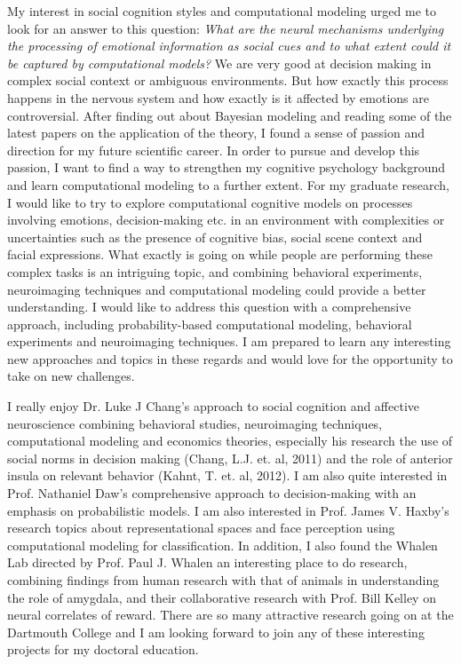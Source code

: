 
My interest in social cognition styles and computational modeling urged me to look for an answer to this question: \textit{What are the neural mechanisms underlying the processing of emotional information as social cues and to what extent could it be captured by computational models?} We are very good at decision making in complex social context or ambiguous environments. But how exactly this process happens in the nervous system and how exactly is it affected by emotions are controversial. After finding out about Bayesian modeling and reading some of the latest papers on the application of the theory, I found a sense of passion and direction for my future scientific career. In order to pursue and develop this passion, I want to find a way to strengthen my cognitive psychology background and learn computational modeling to a further extent. For my graduate research, I would like to try to explore computational cognitive models on processes involving emotions, decision-making etc. in an environment with complexities or uncertainties such as the presence of cognitive bias, social scene context and facial expressions. What exactly is going on while people are performing these complex tasks is an intriguing topic, and combining behavioral experiments, neuroimaging techniques and computational modeling could provide a better understanding. I would like to address this question with a comprehensive approach, including probability-based computational modeling, behavioral experiments and neuroimaging techniques. I am prepared to learn any interesting new approaches and topics in these regards and would love for the opportunity to take on new challenges. 

I really enjoy Dr. Luke J Chang's approach to social cognition and affective neuroscience combining behavioral studies, neuroimaging techniques, computational modeling and economics theories, especially his research the use of social norms in decision making (Chang, L.J. et. al, 2011) and the role of anterior insula on relevant behavior (Kahnt, T. et. al, 2012). I am also quite interested in Prof. Nathaniel Daw's comprehensive approach to decision-making with an emphasis on probabilistic models. I am also interested in Prof. James V. Haxby's research topics about representational spaces and face perception using computational modeling for classification. In addition, I also found the Whalen Lab directed by Prof. Paul J. Whalen an interesting place to do research, combining findings from human  research with that of animals in understanding the role of amygdala, and their collaborative research with Prof. Bill Kelley on neural correlates of reward. There are so many attractive research going on at the Dartmouth College and I am looking forward to join any of these interesting projects for my doctoral education.

